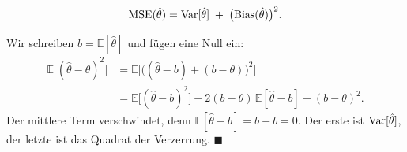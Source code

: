 \begin{merksatz}
\[ \mathrm{MSE}(\hat\theta) = \operatorname{Var}[\hat\theta] \;+\; \bigl(\mathrm{Bias}(\hat\theta)\bigr)^2 . \]

Wir schreiben $b = \mathbb{E}[\hat\theta]$ und fügen eine Null ein:
\begin{align*}
\mathbb{E}\bigl[(\hat\theta-\theta)^2\bigr] &= \mathbb{E}\bigl[\bigl((\hat\theta - b) + (b - \theta)\bigr)^2\bigr]\\
&= \mathbb{E}\bigl[(\hat\theta-b)^2\bigr] + 2(b-\theta)\,\mathbb{E}[\hat\theta - b] + (b-\theta)^2 .
\end{align*}
Der mittlere Term verschwindet, denn $\mathbb{E}[\hat\theta - b] = b - b = 0$. Der erste ist $\operatorname{Var}[\hat\theta]$, der letzte ist das Quadrat der Verzerrung. $\blacksquare$

\begin{center}
\begin{minipage}{0.88\textwidth}
\end{minipage}
\end{center}
\end{merksatz}

